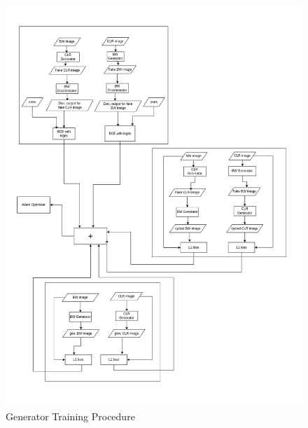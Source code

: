 \begin{figure}[hbtp]
  \centering
  \includegraphics[width=1.1\textwidth]{chapter/img_procedure/generator_procedure_full.png}
  \caption{Generator Training Procedure }
  \label{Generator Training Procedure}
\end{figure}

